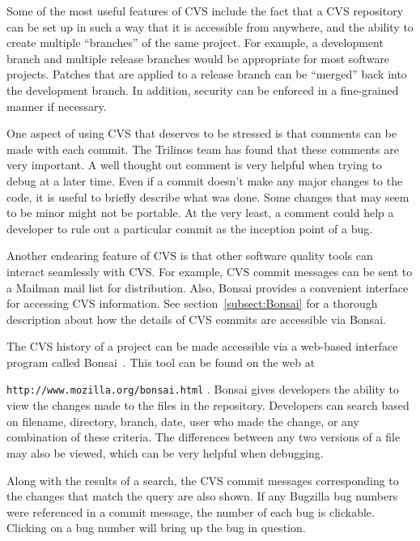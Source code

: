 \documentclass[12pt,relax]{article}
\newcommand{\InlineDirectory}[1]{
  {\hspace{0.01 in}} {\tt #1} {\hspace{0.01 in}}}
\begin{document}
Some of the most useful features of CVS include the fact that a CVS 
repository can be set up in such a way that it is accessible from anywhere, 
and the ability to create multiple ``branches'' of the same project.  For 
example, a development branch and multiple release branches would be 
appropriate for most software projects.  Patches that are applied 
to a release branch can be ``merged'' back into the development branch.  
In addition, security can be enforced in a fine-grained manner if necessary.  

One aspect of using CVS that deserves to be stressed is that comments can be 
made with each commit.  The Trilinos team has found that these comments are 
very important.  A well thought out comment is very helpful when trying to 
debug at a later time.  Even if a commit doesn't make any major changes to the 
code, it is useful to briefly describe what was done.  Some changes that may 
seem to be minor might not be portable.  At the very least, a comment could 
help a developer to rule out a particular commit as the inception point 
of a bug.

Another endearing feature of CVS is that other software quality tools can 
interact seamlessly with CVS.  For example, CVS commit messages can be sent to
a Mailman mail list for distribution.  Also, Bonsai provides a convenient 
interface for accessing CVS information.  See section~\ref{subsect:Bonsai} 
for a thorough description about how the details of CVS commits are accessible 
via Bonsai.


The CVS history of a project can be made accessible via a
web-based interface program called Bonsai~\cite{Bonsai}.  This tool can be 
found on the web at 
\newline
\InlineDirectory{http://www.mozilla.org/bonsai.html}.
Bonsai gives developers the ability to view the changes made to the files in 
the repository. Developers can search 
based on filename, directory, branch, date, user who made the 
change, or any combination of these criteria.  The differences between any two 
versions of a file may also be viewed, which can be very helpful when 
debugging.  

Along with the results of a search, the CVS commit messages corresponding to 
the changes that match the query are also shown.  If any Bugzilla bug numbers 
were referenced in a commit message, the number of each bug is clickable.  
Clicking on a bug number will bring up the bug in question.
\end{document}
